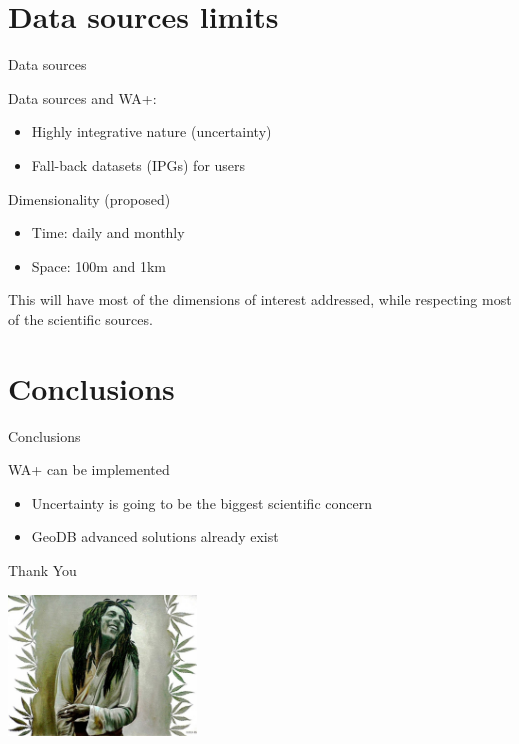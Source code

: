 \documentclass[xcolor=dvipsnames,beamer]{beamer} %
\begin{document}
\section{Data sources limits}
\begin{frame}[fragile]{Data sources}

Data sources and WA+:
\begin{itemize}
 \item Highly integrative nature (uncertainty)
 \item Fall-back datasets (IPGs) for users
\end{itemize}

\begin{block}{Dimensionality (proposed)}
\begin{itemize}
 \item Time: daily and monthly
 \item Space: 100m and 1km
\end{itemize}
This will have most of the dimensions of interest addressed, while respecting most of the scientific sources.
\end{block}

\end{frame}


\section{Conclusions}
\begin{frame}[fragile]{Conclusions}

WA+ can be implemented
\begin{itemize}
 \item Uncertainty is going to be the biggest scientific concern
 \item GeoDB advanced solutions already exist
\end{itemize}

\end{frame}

\begin{frame}[fragile]{Thank You}

\begin{center}
 \includegraphics[width=5cm]{bob}
\end{center}

\end{frame}
\end{document}
